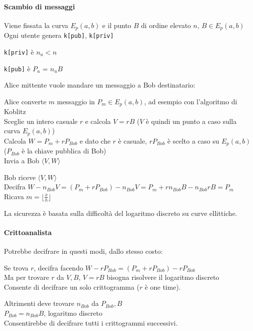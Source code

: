 \documentclass[10pt]{book}
\begin{document}
\paragraph{Scambio di messaggi} Viene fissata la curva $E_p(a,b)$ e il punto $B$ di ordine elevato $n$, $B\in E_p(a,b)$\\
Ogni utente genera \texttt{k[pub]}, \texttt{k[priv]}\begin{list}{}{}
	\item \texttt{k[priv]} è $n_u < n$
	\item \texttt{k[pub]} è $P_u$ = $n_u B$
\end{list}
Alice mittente vuole mandare un messaggio a Bob destinatario:
\begin{list}{}{}
	\item Alice converte $m$ messaggio in $P_m\in E_p(a,b)$, ad esempio con l'algoritmo di Koblitz\\
	Sceglie un intero casuale $r$ e calcola $V = rB$ ($V$ è quindi un punto a caso sulla curva $E_p(a,b)$)\\
	Calcola $W = P_m + rP_{Bob}$ e dato che $r$ è casuale, $rP_{Bob}$ è scelto a caso su $E_p(a,b)$ ($P_{Bob}$ è la chiave pubblica di Bob)\\
	Invia a Bob $\langle V,W\rangle$
	\item Bob riceve $\langle V,W\rangle$\\
	Decifra $W - n_{Bob}V = (P_m + rP_{Bob}) - n_{Bob}V = P_m + rn_{Bob}B - n_{Bob}rB = P_m$\\
	Ricava $m = \lfloor \frac{x}{h}\rfloor$\\
\end{list}
La sicurezza è basata sulla difficoltà del logaritmo discreto su curve ellittiche.
\paragraph{Crittoanalista} Potrebbe decifrare in questi modi, dallo stesso costo:
\begin{list}{}{}
	\item Se trova $r$, decifra facendo $W - rP_{Bob} = (P_m +rP_{Bob}) - rP_{Bob}$\\
	Ma per trovare $r$ da $V,B$, $V = rB$ bisogna risolvere il logaritmo discreto\\
	Consente di decifrare un solo crittogramma ($r$ è one time).
	\item Altrimenti deve trovare $n_{Bob}$ da $P_{Bob},B$\\
	$P_{Bob} = n_{Bob}B$, logaritmo discreto\\
	Consentirebbe di decifrare tutti i crittogrammi successivi.
\end{list}
\end{document}

